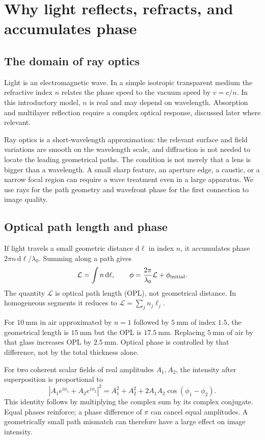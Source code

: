 \chapter{Why light reflects, refracts, and accumulates phase}
\label{fnd:light}
\section{The domain of ray optics}
Light is an electromagnetic wave. In a simple isotropic transparent medium the refractive index $n$ relates the phase speed to the vacuum speed by $v=c/n$. In this introductory model, $n$ is real and may depend on wavelength. Absorption and multilayer reflection require a complex optical response, discussed later where relevant.

Ray optics is a short-wavelength approximation: the relevant surface and field variations are smooth on the wavelength scale, and diffraction is not needed to locate the leading geometrical paths. The condition is not merely that a lens is bigger than a wavelength. A small sharp feature, an aperture edge, a caustic, or a narrow focal region can require a wave treatment even in a large apparatus. We use rays for the path geometry and wavefront phase for the first connection to image quality.

\section{Optical path length and phase}
If light travels a small geometric distance $\mathrm{d}\ell$ in index $n$, it accumulates phase $2\pi n\,\mathrm{d}\ell/\lambda_0$. Summing along a path gives
\begin{equation}
\mathcal{L}=\int n\,\mathrm{d}\ell,
\qquad \phi=\frac{2\pi}{\lambda_0}\mathcal{L}+\phi_{\rm initial}.
\label{fnd:opl}
\end{equation}
The quantity $\mathcal{L}$ is optical path length (OPL), not geometrical distance. In homogeneous segments it reduces to $\mathcal{L}=\sum_j n_j\ell_j$.

For $10\ \mathrm{mm}$ in air approximated by $n=1$ followed by $5\ \mathrm{mm}$ of index $1.5$, the geometrical length is $15\ \mathrm{mm}$ but the OPL is $17.5\ \mathrm{mm}$. Replacing $5\ \mathrm{mm}$ of air by that glass increases OPL by $2.5\ \mathrm{mm}$. Optical phase is controlled by that difference, not by the total thickness alone.

For two coherent scalar fields of real amplitudes $A_1,A_2$, the intensity after superposition is proportional to
\[
|A_1e^{i\phi_1}+A_2e^{i\phi_2}|^2
=A_1^2+A_2^2+2A_1A_2\cos(\phi_1-\phi_2).
\]
This identity follows by multiplying the complex sum by its complex conjugate. Equal phases reinforce; a phase difference of $\pi$ can cancel equal amplitudes. A geometrically small path mismatch can therefore have a large effect on image intensity.

